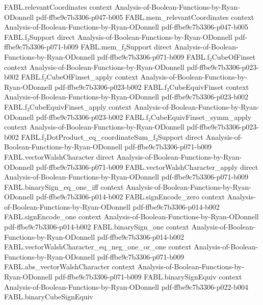 \begin{theorem}
\proofstep
  {FABL.relevantCoordinates}
  {context}
  {Analysis-of-Boolean-Functions-by-Ryan-ODonnell}
  {pdf-ffbe9c7b3306-p047-b005}
\proofstep
  {FABL.mem_relevantCoordinates}
  {context}
  {Analysis-of-Boolean-Functions-by-Ryan-ODonnell}
  {pdf-ffbe9c7b3306-p047-b005}
\proofstep
  {FABL.f₂Support}
  {direct}
  {Analysis-of-Boolean-Functions-by-Ryan-ODonnell}
  {pdf-ffbe9c7b3306-p071-b009}
\proofstep
  {FABL.mem_f₂Support}
  {direct}
  {Analysis-of-Boolean-Functions-by-Ryan-ODonnell}
  {pdf-ffbe9c7b3306-p071-b009}
\proofstep
  {FABL.f₂CubeOfFinset}
  {context}
  {Analysis-of-Boolean-Functions-by-Ryan-ODonnell}
  {pdf-ffbe9c7b3306-p023-b002}
\proofstep
  {FABL.f₂CubeOfFinset_apply}
  {context}
  {Analysis-of-Boolean-Functions-by-Ryan-ODonnell}
  {pdf-ffbe9c7b3306-p023-b002}
\proofstep
  {FABL.f₂CubeEquivFinset}
  {context}
  {Analysis-of-Boolean-Functions-by-Ryan-ODonnell}
  {pdf-ffbe9c7b3306-p023-b002}
\proofstep
  {FABL.f₂CubeEquivFinset_apply}
  {context}
  {Analysis-of-Boolean-Functions-by-Ryan-ODonnell}
  {pdf-ffbe9c7b3306-p023-b002}
\proofstep
  {FABL.f₂CubeEquivFinset_symm_apply}
  {context}
  {Analysis-of-Boolean-Functions-by-Ryan-ODonnell}
  {pdf-ffbe9c7b3306-p023-b002}
\proofstep
  {FABL.f₂DotProduct_eq_coordinateSum_f₂Support}
  {direct}
  {Analysis-of-Boolean-Functions-by-Ryan-ODonnell}
  {pdf-ffbe9c7b3306-p071-b009}
\proofstep
  {FABL.vectorWalshCharacter}
  {direct}
  {Analysis-of-Boolean-Functions-by-Ryan-ODonnell}
  {pdf-ffbe9c7b3306-p071-b009}
\proofstep
  {FABL.vectorWalshCharacter_apply}
  {direct}
  {Analysis-of-Boolean-Functions-by-Ryan-ODonnell}
  {pdf-ffbe9c7b3306-p071-b009}
\proofstep
  {FABL.binarySign_eq_one_iff}
  {context}
  {Analysis-of-Boolean-Functions-by-Ryan-ODonnell}
  {pdf-ffbe9c7b3306-p014-b002}
\proofstep
  {FABL.signEncode_zero}
  {context}
  {Analysis-of-Boolean-Functions-by-Ryan-ODonnell}
  {pdf-ffbe9c7b3306-p014-b002}
\proofstep
  {FABL.signEncode_one}
  {context}
  {Analysis-of-Boolean-Functions-by-Ryan-ODonnell}
  {pdf-ffbe9c7b3306-p014-b002}
\proofstep
  {FABL.binarySign_one}
  {context}
  {Analysis-of-Boolean-Functions-by-Ryan-ODonnell}
  {pdf-ffbe9c7b3306-p014-b002}
\proofstep
  {FABL.vectorWalshCharacter_eq_neg_one_or_one}
  {context}
  {Analysis-of-Boolean-Functions-by-Ryan-ODonnell}
  {pdf-ffbe9c7b3306-p071-b009}
\proofstep
  {FABL.abs_vectorWalshCharacter}
  {context}
  {Analysis-of-Boolean-Functions-by-Ryan-ODonnell}
  {pdf-ffbe9c7b3306-p071-b009}
\proofstep
  {FABL.binarySignEquiv}
  {context}
  {Analysis-of-Boolean-Functions-by-Ryan-ODonnell}
  {pdf-ffbe9c7b3306-p022-b004}
\proofstep
  {FABL.binaryCubeSignEquiv}

\end{theorem}
